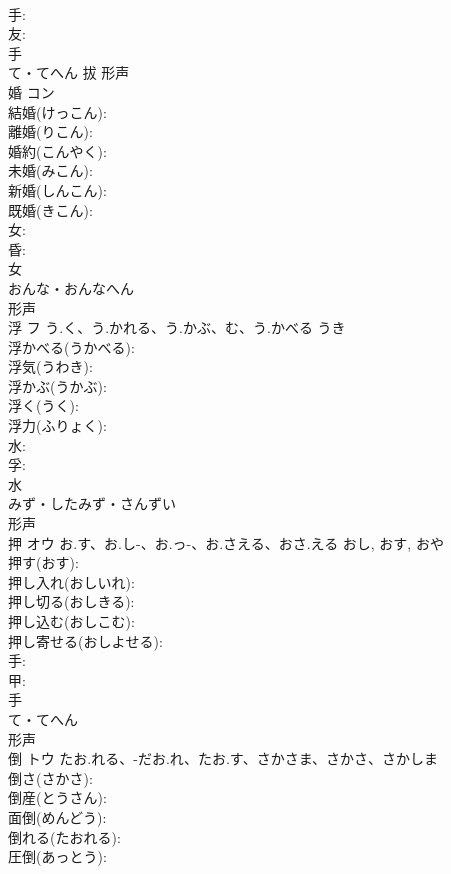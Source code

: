\documentclass[8pt]{extreport}
\begin{document}
\begin{CJK}{UTF8}{min}
\\	手: 
\\	友: 
\\	手	
\\	て・てへん	拔	形声 
\\	婚	コン			
\\	結婚(けっこん): 
\\	離婚(りこん): 
\\	婚約(こんやく): 
\\	未婚(みこん): 
\\	新婚(しんこん): 
\\	既婚(きこん): 
\\	女: 
\\	昏: 
\\	女	
\\	おんな・おんなへん	
\\	形声 
\\	浮	フ	う.く、う.かれる、う.かぶ、む、う.かべる	うき	
\\	浮かべる(うかべる): 
\\	浮気(うわき): 
\\	浮かぶ(うかぶ): 
\\	浮く(うく): 
\\	浮力(ふりょく): 
\\	水: 
\\	孚: 
\\	水	
\\	みず・したみず・さんずい	
\\	形声 
\\	押	オウ	お.す、お.し-、お.っ-、お.さえる、おさ.える	おし, おす, おや	
\\	押す(おす): 
\\	押し入れ(おしいれ): 
\\	押し切る(おしきる): 
\\	押し込む(おしこむ): 
\\	押し寄せる(おしよせる): 
\\	手: 
\\	甲: 
\\	手	
\\	て・てへん	
\\	形声 
\\	倒	トウ	たお.れる、-だお.れ、たお.す、さかさま、さかさ、さかしま		
\\	倒さ(さかさ): 
\\	倒産(とうさん): 
\\	面倒(めんどう): 
\\	倒れる(たおれる): 
\\	圧倒(あっとう): 

\end{CJK}
\end{document}
